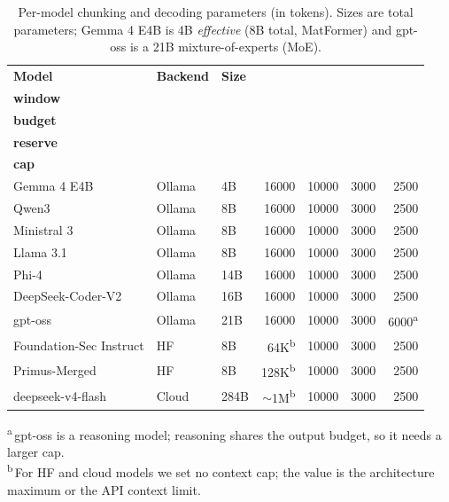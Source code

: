 \begin{table}[!htp]
\centering
\caption{Per-model chunking and decoding parameters (in tokens). Sizes are total parameters; Gemma 4 E4B is 4B \emph{effective} (8B total, MatFormer) and gpt-oss is a 21B mixture-of-experts (MoE).}
\label{tab:chunk}
\small
\begin{tabular}{lllrrrr}
\hline
\textbf{Model} & \textbf{Backend} & \textbf{Size} &
\shortstack{\textbf{Context}\\\textbf{window}} &
\shortstack{\textbf{Chunk}\\\textbf{budget}} &
\shortstack{\textbf{Output}\\\textbf{reserve}} &
\shortstack{\textbf{Output}\\\textbf{cap}} \\
\hline
Gemma 4 E4B             & Ollama & 4B   & 16000 & 10000 & 3000 & 2500 \\
Qwen3                   & Ollama & 8B   & 16000 & 10000 & 3000 & 2500 \\
Ministral 3             & Ollama & 8B   & 16000 & 10000 & 3000 & 2500 \\
Llama 3.1               & Ollama & 8B   & 16000 & 10000 & 3000 & 2500 \\
Phi-4                   & Ollama & 14B  & 16000 & 10000 & 3000 & 2500 \\
DeepSeek-Coder-V2       & Ollama & 16B  & 16000 & 10000 & 3000 & 2500 \\
gpt-oss                 & Ollama & 21B  & 16000 & 10000 & 3000 & 6000\textsuperscript{a} \\
Foundation-Sec Instruct & HF     & 8B   & 64K\textsuperscript{b}  & 10000 & 3000 & 2500 \\
Primus-Merged           & HF     & 8B   & 128K\textsuperscript{b} & 10000 & 3000 & 2500 \\
\hline
deepseek-v4-flash       & Cloud  & 284B & $\sim$1M\textsuperscript{b} & 10000 & 3000 & 2500 \\
\hline
\end{tabular}

\vspace{3pt}
{\footnotesize\raggedright
\textsuperscript{a}\,gpt-oss is a reasoning model; reasoning shares the output budget, so it needs a larger cap.\\
\textsuperscript{b}\,For HF and cloud models we set no context cap; the value is the architecture maximum or the API context limit.\par}
\end{table}

